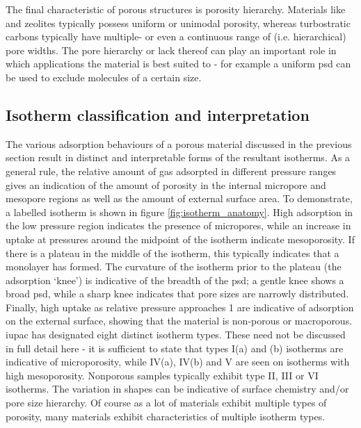 The final characteristic of porous structures is porosity hierarchy. Materials like  and zeolites typically possess uniform or unimodal porosity,\citep{WeitkampZeolites, Siriwardane2005Adsorption, Ding2019Carbon, lin2009hydrogen} whereas \glspl{turbostratic carbon} typically have multiple- or even a continuous range of (i.e. hierarchical) pore widths.\citep{Li2020Hierarchical, Sevilla2014Energy, Xia2008Hierarchical, Balahmar2017Biomass} The pore hierarchy or lack thereof can play an important role in which applications the material is best suited to - for example a uniform \acrfull{psd} can be used to exclude molecules of a certain size.\citep{qian2020mof, reid2001adsorption, Adeniran2014family}

\subsection{Isotherm classification and interpretation}
\label{ss:iso_interpretation}

The various adsorption behaviours of a porous material discussed in the previous section result in distinct and interpretable forms of the resultant isotherms. As a general rule, the relative amount of gas adsorpted in different pressure ranges gives an indication of the amount of porosity in the internal \gls{micropore} and \gls{mesopore} regions as well as the amount of external surface area. To demonstrate, a labelled isotherm is shown in figure \ref{fig:isotherm_anatomy}. High adsorption in the low pressure region indicates the presence of \glspl{micropore}, while an increase in uptake at pressures around the midpoint of the isotherm indicate mesoporosity. If there is a plateau in the middle of the isotherm, this typically indicates that a monolayer has formed. The curvature of the isotherm prior to the plateau (the adsorption `knee') is indicative of the breadth of the \acrshort{psd}; a gentle knee shows a broad \acrshort{psd}, while a sharp knee indicates that pore sizes are narrowly distributed. Finally, high uptake as relative pressure approaches 1 are indicative of adsorption on the external surface, showing that the material is non-porous or macroporous.\citep{Thommes2015Physisorption} \acrshort{iupac} has designated eight distinct isotherm types.\citep{Thommes2015Physisorption, Sing1985} These need not be discussed in full detail here - it is sufficient to state that types I(a) and (b) isotherms are indicative of microporosity, while IV(a), IV(b) and V are seen on isotherms with high mesoporosity. Nonporous samples typically exhibit type II, III or VI isotherms. The variation in shapes can be indicative of surface chemistry and/or pore size hierarchy.\citep{thommes2014physical, monson2012understanding} Of course as a lot of materials exhibit multiple types of porosity, many materials exhibit characteristics of multiple isotherm types.\citep{Thommes2015Physisorption} 

